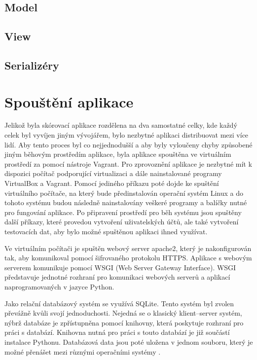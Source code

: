 \documentclass[
  digital, %
  twoside, %
  table,   %
  lof,     %
  lot,     %
]{fithesis3}
\begin{document}
\subsection{Model}
\subsection{View}
\subsection{Serializéry}

\section{Spouštění aplikace}

Jelikož byla skórovací aplikace rozdělena na dva samostatné celky, kde každý celek byl vyvíjen jiným vývojářem, bylo nezbytné aplikaci distribuovat mezi více lidí. Aby tento proces byl co nejjednodušší a aby byly vyloučeny chyby způsobené jiným běhovým prostředím aplikace, byla aplikace spouštěna ve virtuálním prostředí za pomocí nástroje Vagrant. Pro zprovoznění aplikace je nezbytné mít k dispozici počítač podporující virtualizaci a dále nainstalované programy VirtualBox a Vagrant. Pomocí jediného příkazu poté dojde ke spuštění virtuálního počítače, na který bude předinstalován operační systém Linux a do tohoto systému budou následně nainstalovány veškeré programy a balíčky nutné pro fungování aplikace. Po připravení prostředí pro běh systému jsou spuštěny další příkazy, které provedou vytvoření uživatelských účtů, ale také vytvoření testovacích dat, aby bylo možné spuštěnou aplikaci ihned využívat. 

Ve virtuálním počítači je spuštěn webový server apache2, který je nakonfigurován tak, aby komunikoval pomocí šifrovaného protokolu HTTPS. Aplikace s webovým serverem komunikuje pomocí WSGI (Web Server Gateway Interface). WSGI představuje jednotné rozhraní pro komunikaci webových serverů a aplikací naprogramovaných v jazyce Python.

Jako relační databázový systém se využívá SQLite. Tento systém byl zvolen převážně kvůli svojí jednoduchosti. Nejedná se o klasický klient–server systém, nýbrž databáze je zpřístupněna pomocí knihovny, která poskytuje rozhraní pro práci s databází. Knihovna nutná pro práci s touto databází je již součástí instalace Pythonu. Databázová data jsou poté uložena v jednom souboru, který je možné přenášet mezi různými operačními systémy \cite{sqlite}.
\end{document}
